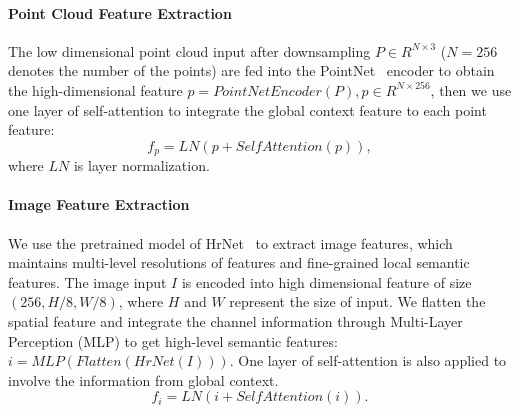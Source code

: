\documentclass[letterpaper]{article} %
\begin{document}
\paragraph{Point Cloud Feature Extraction}
The low dimensional point cloud input after downsampling $P \in R^{N\times 3}$ ($N=256$ denotes the number of the points) are fed into the PointNet~\cite{qi2017pointnet} encoder to obtain the high-dimensional feature $p=PointNetEncoder(P), p \in R^{N\times 256}$, then we use one layer of self-attention to integrate the global context feature to each point feature:
$$f_p = LN(p+SelfAttention(p)),$$ where $LN$ is layer normalization.


\paragraph{Image Feature Extraction}
We use the pretrained model of HrNet~\cite{wang2020hrnet}  to extract image features, which maintains multi-level resolutions of features and fine-grained local semantic features. The image input $I$ is encoded into high dimensional feature of size $(256, H/8 , W/8)$, where $H$ and $W$ represent the size of input. We flatten the spatial feature and integrate the channel information through Multi-Layer Perception (MLP) to get high-level semantic features: $i= MLP(Flatten({HrNet}(I)))$. One layer of self-attention is also applied to involve the information from global context.
$$f_i = LN(i + SelfAttention(i)).$$


\end{document}
